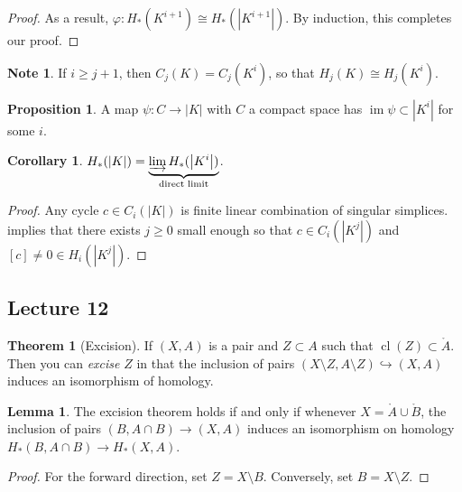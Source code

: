 \documentclass[10pt,letterpaper,cm]{nupset}
\theoremstyle{definition}
\newtheorem{note}[definition]{Note}
\theoremstyle{theorem}
\newtheorem{theorem}[definition]{Theorem}
\newtheorem{lemma}[definition]{Lemma}
\newtheorem{prop}[definition]{Proposition}
\newtheorem{corollary}[definition]{Corollary}
\theoremstyle{remark}
\newcommand{\1}{\mathbb{1}}
\newcommand{\0}{\vec 0}
\DeclareMathOperator{\im}{im}
\DeclareMathOperator{\cl}{cl}
\begin{document}
\begin{proof}
As a result, $\varphi : H_{\ast}(K^{i+1}) \cong H_{\ast}(\left\lvert{K^{i+1}}\right\rvert)$. By induction, this completes our proof.
\end{proof}

\begin{note}
If $i\geq j+1$, then $C_j(K) = C_j(K^i)$, so that $H_j(K) \cong H_j(K^i)$.
\end{note}

\begin{prop}\label{p1}
A map $\psi : C \to \left\lvert{K}\right\rvert$ with $C$ a compact space has $\im{\psi} \subset \left\lvert{K^i}\right\rvert$ for some $i$.
\end{prop}

\begin{corollary}
$H_{\ast}(\left\lvert{K}\right\rvert) = \underbrace{\varinjlim H_{\ast}(\left\lvert{K^i}\right\rvert)}_{\text{direct limit}}$.
\end{corollary}
\begin{proof}
Any cycle $c\in C_i(\left\lvert{K}\right\rvert)$ is finite linear combination of singular simplices.  implies that there exists $j\geq 0$ small enough so that $c \in  C_i(\left\lvert{K^j}\right\rvert)$ and $[c]\ne 0 \in H_i(\left\lvert{K^j}\right\rvert)$.
\end{proof}


\subsection{Lecture 12}

\begin{theorem}[Excision]
If $\left(X, A\right)$ is a pair and $Z\subset A$ such that $\cl(Z) \subset \mathring{A}$. Then you can \textit{excise} $Z$ in that the inclusion of pairs $\left(X\setminus Z, A \setminus Z\right) \hookrightarrow \left(X, A\right)$ induces an isomorphism of homology. 
\end{theorem}

\begin{lemma}\label{l25}
The excision theorem holds if and only if whenever $X= \mathring{A} \cup \mathring{B}$, the inclusion of pairs $\left(B, A\cap B\right) \to (X,A)$ induces an isomorphism on homology $H_{\ast}(B, A\cap B) \to H_{\ast}(X,A)$.
\end{lemma}
\begin{proof}
For the forward direction, set $Z= X\setminus B$. Conversely, set $B = X \setminus Z$.
\end{proof}
\end{document}
